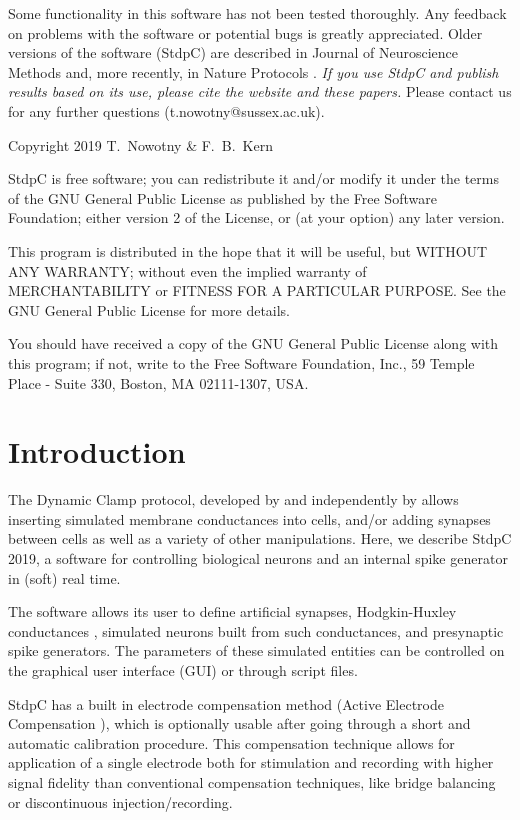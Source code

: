 \documentclass{article}
\begin{document}
Some functionality in this software has
not been tested thoroughly. Any feedback on problems with the
software or potential bugs is greatly appreciated.  Older versions
of the software (StdpC) are described in Journal of Neuroscience
Methods \cite{Nowotny2006} and, more recently, in Nature Protocols 
\cite{Kemenes2011}. {\em If you use StdpC and publish results
based on its use, please cite the website and these papers.} Please
contact us for any further questions (t.nowotny@sussex.ac.uk).

Copyright 2019 T.~Nowotny \& F.~B.~Kern

StdpC is free software; you can redistribute it and/or modify  
it under the terms of the GNU General Public License as published by 
the Free Software Foundation; either version 2 of the License, or 
(at your option) any later version.                               

This program is distributed in the hope that it will be useful,
but WITHOUT ANY WARRANTY; without even the implied warranty of
MERCHANTABILITY or FITNESS FOR A PARTICULAR PURPOSE.  See the 
GNU General Public License for more details.

You should have received a copy of the GNU General Public License
along with this program; if not, write to the
Free Software Foundation, Inc., 59 Temple Place - Suite 330, Boston,
MA  02111-1307, USA.

\newpage
\section{Introduction}
           
The Dynamic Clamp protocol, developed by \cite{Sharp1993} and
independently by \cite{Robinson1993} allows inserting simulated
membrane conductances into cells, and/or adding synapses between cells
as well as a variety of other manipulations. Here, we describe StdpC
2019, a software for controlling biological neurons and an internal
spike generator in (soft) real time.

The software allows its user to define artificial synapses, Hodgkin-Huxley conductances
\cite{Hodgkin1949}, simulated neurons built from such conductances, and
presynaptic spike generators. The parameters of these simulated
entities can be controlled on the graphical user interface (GUI) or
through script files.  

StdpC has a built in electrode compensation method (Active
Electrode Compensation \cite{Brette2008}), which is optionally usable after
going through a short and automatic calibration procedure. This
compensation technique allows for application of a single electrode both
for stimulation and recording with higher signal fidelity than conventional
compensation techniques, like bridge balancing or discontinuous
injection/recording. 
\end{document}
